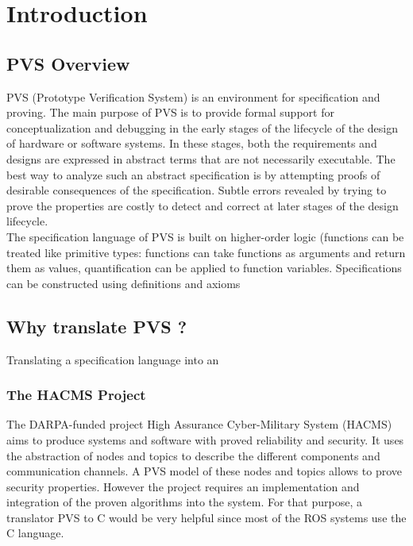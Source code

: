 \documentclass[12pt,a4paper]{article}
\begin{document}
\newpage
\tableofcontents
\newpage

\section{Introduction}


\subsection{PVS Overview}

PVS  (Prototype Verification System) is an environment for specification and proving. The main purpose of PVS is to provide 
formal support for conceptualization and debugging in the early stages of the lifecycle of the design of hardware or software systems. In these stages, both the requirements and designs are expressed in abstract terms that are not necessarily executable. The best way to analyze such an abstract specification is by  attempting proofs of desirable consequences of the specification. Subtle errors revealed by trying to prove the properties are costly to detect and correct at later stages of the design lifecycle. \\

The specification language of PVS is built on higher-order logic (functions can be treated like primitive types: functions can take functions as arguments and return them as values, quantification can be applied to function variables. Specifications can be constructed using definitions and axioms





\subsection{Why translate PVS ?}

Translating a specification language into an 

\subsubsection*{The HACMS Project}

The DARPA-funded project High Assurance Cyber-Military System (HACMS) aims to produce systems and software with proved reliability and security. It uses the abstraction of nodes and topics to describe the different components and communication
channels. A PVS model of these nodes and topics allows to prove security properties. However the project requires an implementation and integration of the proven algorithms into the system. For that purpose, a translator PVS to C would be very helpful since most of the ROS systems use the C language.
\end{document}
